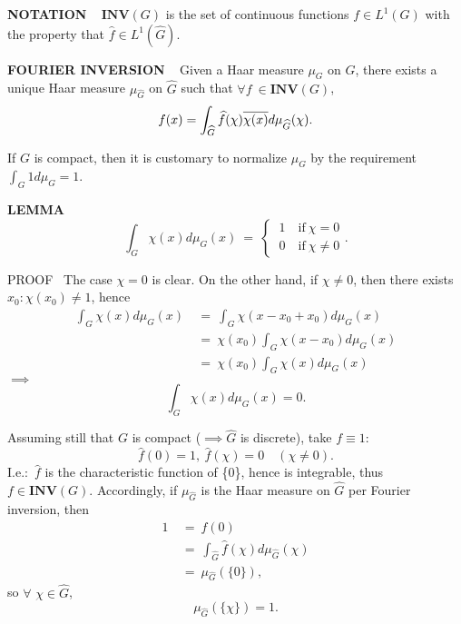 \vspace{0.1cm}

\begin{x}{\small\bf NOTATION} \ %
$\mathbf{INV}(G)$ is the set of continuous functions $f \in L^1(G)$ with the property that $\widehat{f} \in L^1(\widehat{G})$.
\end{x}

\vspace{0.1cm}

\begin{x}{\small\bf FOURIER INVERSION} \ %
Given a Haar measure $\mu_G$ on $G$, 
there exists a unique Haar measure $\mu_{\widehat{G}}$ on $\widehat{G}$ such that $\forall f \  \in \mathbf{INV}(G)$,
\[
f(x) = \int_{\widehat{G}} \widehat{f}(\chi) \overline{\chi (x)} d\mu_{\widehat{G}} (\chi).
\]
\end{x}

\vspace{0.1cm}

If $G$ is compact, then it is customary to normalize $\mu_G$ by the requirement $\int_G 1 d\mu_G = 1$.

\vspace{0.1cm}


\begin{x}{\small\bf LEMMA} \ %
\[ 
\int_G \chi(x) d\mu_G(x) \ = \  
\begin{cases}
\ 1  \quad \text{if} \  \chi = 0\\
\ 0 \quad \text{if} \ \chi \ne 0
\end{cases}
.
\]

\vspace{0.1cm}

PROOF \  The case $\chi = 0$ is clear.  On the other hand, if $\chi \ne 0$, then there exists $x_0 : \chi (x_0) \ne 1$, hence
\begin{align*}
\int_G \chi(x) d\mu_G(x) \ 
&= \ \int_G \chi (x - x_0 + x_0) d\mu_G (x)\\
&= \ \chi (x_0) \int_G \chi (x - x_0) d\mu_G (x)\\
&= \ \chi (x_0) \int_G \chi (x) d\mu_G (x)
\end{align*}
$\implies$
\[
\int_G \chi (x) d\mu_G (x) = 0 .
\]
\end{x}

\vspace{0.1cm}

Assuming still that $G$ is compact ($\implies \widehat{G}$ is discrete), take $f \equiv 1:$
\[
\widehat{f}(0) = 1, \   \widehat{f}(\chi) = 0 	 \quad (\chi \ne 0). 
\]
I.e.$:$	$\widehat{f}$ is the characteristic function of \{0\}, hence is integrable, thus $f \in \mathbf{INV}(G)$.  
Accordingly, if $\mu_{\widehat{G}}$ is the Haar measure on $\widehat{G}$ per Fourier inversion, then
\begin{align*}
1 \ 
&= \ f(0) \\
&= \ \int_{\widehat{G}} \widehat{f}(\chi) d\mu_{\widehat{G}} (\chi) \\
&= \ \mu_{\widehat{G}} (\{0\}), 
\end{align*}
so $\forall$ $\chi \in \widehat{G}$,
\[
\mu_{\widehat{G}} (\{\chi\}) = 1.
\]

